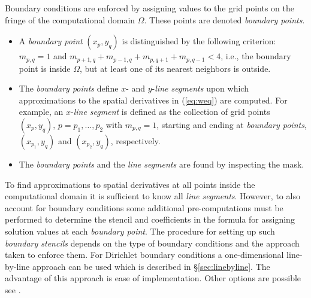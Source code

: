 \documentclass[11pt]{article}
\begin{document}
Boundary conditions are enforced by assigning values to the grid points on the fringe of the
computational domain $\Omega$. These points are denoted \emph{boundary points}. 
\begin{itemize}
\item A \emph{boundary
point} $(x_p,y_q)$ is distinguished by the following criterion: $m_{p,q} = 1$ and $m_{p+1,q} +
m_{p-1,q} +m_{p,q+1} +m_{p,q-1} < 4$, i.e., the boundary point is inside $\Omega$, but at least one
of its nearest neighbors is outside. 
\item The \emph{boundary points} define $x$- and $y$-\emph{line
segments} upon which approximations to the spatial derivatives in (\ref{eq:weq}) are computed. For
example, an $x$-\emph{line segment} is defined as the collection of grid points $(x_{p},y_q),\, p =
p_1,\ldots,p_2$ with $m_{p,q}=1$, starting and ending at \emph{boundary points}, $(x_{p_1},y_q)$ and
$(x_{p_2},y_q)$, respectively. 
\item The \emph{boundary points} and the \emph{line segments} are found by inspecting the mask.
\end{itemize}

To find approximations to spatial derivatives at all points inside the computational domain it is
sufficient to know all \emph{line segments}. However, to also account for boundary conditions some
additional pre-computations must be performed to determine the stencil and coefficients in the
formula for assigning solution values at each \emph{boundary point}. The procedure for setting up
such \emph{boundary stencils} depends on the type of boundary conditions and the approach taken to
enforce them. For Dirichlet boundary conditions a one-dimensional line-by-line approach can be used
which is described in \S\ref{sec:linebyline}. The advantage of this approach is ease of
implementation. Other options are possible see \cite{AppPetEB09}.
\end{document}
